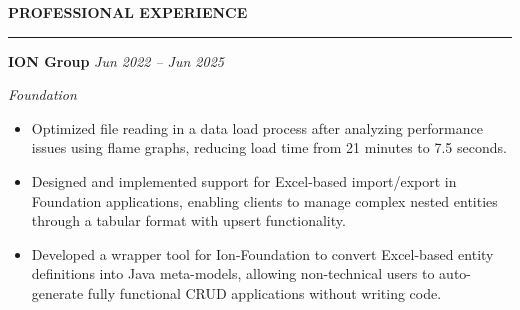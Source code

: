 \documentclass[a4paper,10pt]{article}
\newcommand{\cvHeaderOne}[1]{%
  \vspace*{1.5em}%
  {\noindent\large\textbf{\MakeUppercase{#1}}\par}%
  \noindent\rule{\linewidth}{0.4pt}%
  \vspace*{0.5em}%
}
\newcommand{\cvHeaderTwo}[2]{%
  \vspace{0.8em}%
  \noindent\textbf{\normalsize #1} \hfill \textit{#2}\par%
}
\newcommand{\cvHeaderThree}[1]{%
  \noindent\textit{#1}%
}
\newenvironment{cvItemList}{%
  \begin{itemize}%
    \setlength{\itemsep}{0.1em}%
    \setlength{\topsep}{0em}%
    \setlength{\partopsep}{0em}%
    \setlength{\parsep}{0em}%
    \setlength{\parskip}{0em}%
}{%
  \end{itemize}%
}
\begin{document}
\cvHeaderOne{Professional Experience}

\cvHeaderTwo{ION Group}{Jun 2022 -- Jun 2025}

\cvHeaderThree{Foundation}

\begin{cvItemList}
  \item Optimized file reading in a data load process after analyzing performance issues using flame graphs, reducing load time from 21 minutes to 7.5 seconds.
  \item Designed and implemented support for Excel-based import/export in Foundation applications, enabling clients to manage complex nested entities through a tabular format with upsert functionality. 
  \item Developed a wrapper tool for Ion-Foundation to convert Excel-based entity definitions into Java meta-models, allowing non-technical users to auto-generate fully functional CRUD applications without writing code. 
\end{cvItemList}
\end{document}
